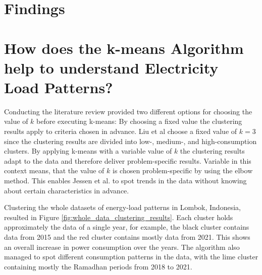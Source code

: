 \section{Findings}
\label{cha:findings}



\section{How does the k-means Algorithm help to understand Electricity Load Patterns?}
\label{sec:findings_understand_electricity_load_patterns}
Conducting the literature review provided two different options for choosing the value of $k$ before executing k-means:
By choosing a fixed value the clustering results apply to criteria chosen in advance.
Liu et al \cite{LIU-BDE} choose a fixed value of $k=3$ since the clustering results are divided into low-, medium-, and high-consumption clusters.
By applying k-means with a variable value of $k$ the clustering results adapt to the data and therefore deliver problem-specific results.
Variable in this context means, that the value of $k$ is chosen problem-specific by using the elbow method.
This enables Jessen et al. \cite{JES-IND} to spot trends in the data without knowing about certain characteristics in advance.

Clustering the whole datasets of energy-load patterns in Lombok, Indonesia, resulted in Figure \ref{fig:whole_data_clustering_results}.
Each cluster holds approximately the data of a single year, for example, the black cluster contains data from 2015 and the red cluster contains mostly data from 2021.
This shows an overall increase in power consumption over the years.
The algorithm also managed to spot different consumption patterns in the data, with the lime cluster containing mostly the Ramadhan periods from 2018 to 2021.

